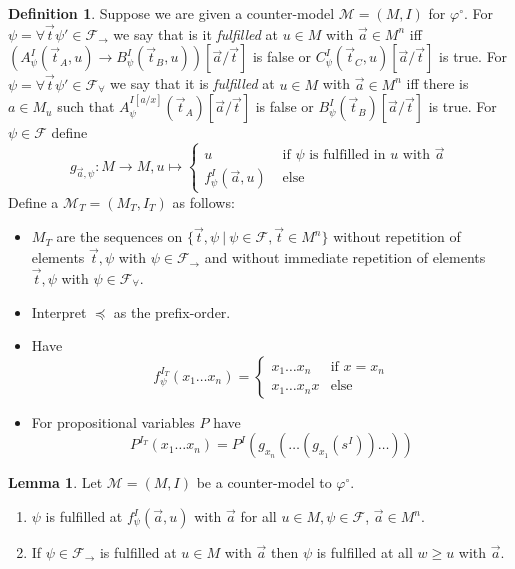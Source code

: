 \documentclass[a4paper,12pt]{report}
\theoremstyle{definition}
\theoremstyle{definition}
\theoremstyle{definition}
\newtheorem{lemma}[theorem]{Lemma}
\theoremstyle{definition}
\theoremstyle{definition}
\newtheorem{definition}[theorem]{Definition}
\theoremstyle{definition}
\theoremstyle{definition}
\begin{document}
	\begin{definition}
		Suppose we are given a counter-model $\mathcal M = (M, I)$ for $\varphi^\circ$. For $\psi = \forall\vec t\psi'\in\mathcal F_\to$ we say that is it \textit{fulfilled} at $u\in M$ with $\vec a\in M^n$ iff $(A_\psi^I(\vec t_A, u)\to B_\psi^I(\vec t_B, u))[\vec a/\vec t]$ is false or $C_\psi^I(\vec t_C, u)[\vec a/\vec t]$ is true.
		For $\psi = \forall\vec t\psi'\in\mathcal F_\forall$ we say that it is \textit{fulfilled} at $u\in M$ with $\vec a\in M^n$ iff there is $a\in M_u$ such that $A^{I[a/x]}_\psi(\vec t_A)[\vec a/\vec t]$ is false or $B_\psi^I(\vec t_B)[\vec a/\vec t]$ is true. For $\psi\in\mathcal F$ define $$g_{\vec a, \psi} : M\to M, u\mapsto\begin{cases}
			u&\text{ if $\psi$ is fulfilled in $u$ with $\vec a$}\\
			f^I_\psi(\vec a, u)&\text{ else}		
		\end{cases}$$		
		Define a $\mathcal M_T = (M_T, I_T)$ as follows:
		\begin{itemize}
			\item $M_T$ are the sequences on $\{ \vec t, \psi\:|\:\psi\in \mathcal F, \vec t\in M^n\}$ without repetition of elements $\vec t,\psi$ with $\psi\in\mathcal F_\to$ and without immediate repetition of elements $\vec t,\psi$ with $\psi\in\mathcal F_\forall$.
			\item Interpret $\preceq$ as the prefix-order.
			\item Have $$f_\psi^{I_T}(x_1\dots x_n) = \begin{cases}
				x_1\dots x_n&\text{if $x=x_n$}\\
				x_1\dots x_nx&\text{else}			
			\end{cases}$$
			\item For propositional variables $P$ have $$P^{I_T}(x_1\dots x_n) = P^I(g_{x_n}(\dots(g_{x_1}(s^I))\dots))$$
		\end{itemize}
	\end{definition}
	
	\begin{lemma}
		Let $\mathcal M = (M, I)$ be a counter-model to $\mathcal \varphi^\circ$.
		\begin{enumerate}
			\item $\psi$ is fulfilled at $f_\psi^I(\vec a, u)$ with $\vec a$ for all $u\in M, \psi\in\mathcal F$, $\vec a\in M^n$.
			\item If $\psi\in\mathcal F_\to$ is fulfilled at $u\in M$ with $\vec a$ then $\psi$ is fulfilled at all $w\geq u$ with $\vec a$.
		\end{enumerate}	
	\end{lemma}
	
\end{document}
